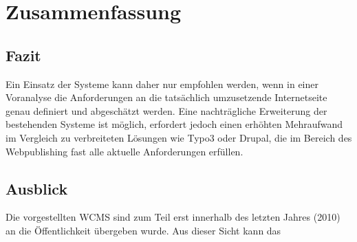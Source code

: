 \chapter{Zusammenfassung}

\section{Fazit}

Ein Einsatz der Systeme kann daher nur empfohlen werden, wenn in einer Voranalyse die Anforderungen an die tatsächlich umzusetzende Internetseite genau definiert und abgeschätzt werden. Eine nachträgliche Erweiterung der bestehenden Systeme ist möglich, erfordert jedoch einen erhöhten Mehraufwand im Vergleich zu verbreiteten Lösungen wie Typo3 oder Drupal, die im Bereich des Webpublishing fast alle aktuelle Anforderungen erfüllen.



\section{Ausblick}
Die vorgestellten WCMS sind zum Teil erst innerhalb des letzten Jahres (2010) an die Öffentlichkeit übergeben wurde. Aus dieser Sicht kann das
